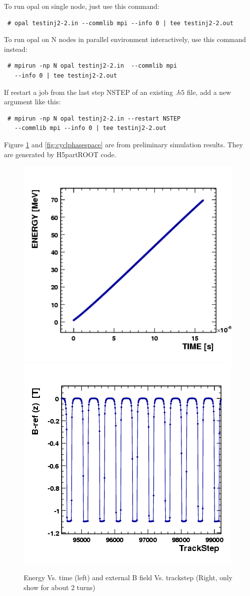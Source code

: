 To run opal on single node, just use this command:
{ \footnotesize 
\begin{verbatim}
 # opal testinj2-2.in --commlib mpi --info 0 | tee testinj2-2.out
\end{verbatim}
}
To run opal on N nodes in parallel environment interactively, use this command instead:
{ \footnotesize 
\begin{verbatim}
 # mpirun -np N opal testinj2-2.in  --commlib mpi 
   --info 0 | tee testinj2-2.out
\end{verbatim}
 }
If restart a job from the last step NSTEP of an existing $.h5$ file, add a new argument like this: 
{ \footnotesize 
\begin{verbatim}
 # mpirun -np N opal testinj2-2.in --restart NSTEP 
   --commlib mpi --info 0 | tee testinj2-2.out
\end{verbatim}
}
Figure \ref{fig:cyclParameters} and \ref{fig:cyclphasespace} are from preliminary simulation results.
They are generated by H5partROOT code.   
\begin{figure}[ht]
  \begin{center} 
    \includegraphics[width=0.45\linewidth]{figures/cyclotron/Inj2-ENERGY-TIME.png}
    \includegraphics[width=0.45\linewidth]{figures/cyclotron/Inj2-B-ref-z-TrackStep.png}
    \caption{Energy Vs. time (left) and external B field Vs. trackstep (Right, only show for about 2 turns)}
    \label{fig:cyclParameters}
  \end{center}
\end{figure}


